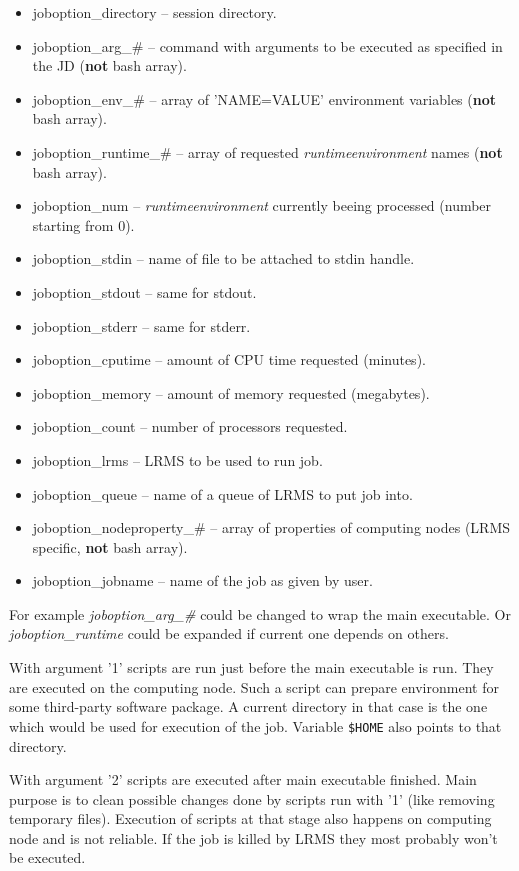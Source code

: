 \documentclass{article}                            %
\begin{document}
\begin{itemize}
\item joboption\_directory -- session directory.
\item joboption\_arg\_\# -- command with arguments to be executed as specified
in the JD (\textbf{not} bash array).
\item joboption\_env\_\# -- array of 'NAME=VALUE' environment variables (\textbf{not}
bash array).
\item joboption\_runtime\_\# -- array of requested \emph{runtimeenvironment}
names (\textbf{not} bash array).
\item joboption\_num -- \emph{runtimeenvironment} currently beeing processed
(number starting from 0).
\item joboption\_stdin -- name of file to be attached to stdin handle.
\item joboption\_stdout -- same for stdout.
\item joboption\_stderr -- same for stderr.
\item joboption\_cputime -- amount of CPU time requested (minutes).
\item joboption\_memory -- amount of memory requested (megabytes).
\item joboption\_count -- number of processors requested.
\item joboption\_lrms -- LRMS to be used to run job.
\item joboption\_queue -- name of a queue of LRMS to put job into.
\item joboption\_nodeproperty\_\# -- array of properties of computing nodes
(LRMS specific, \textbf{not} bash array).
\item joboption\_jobname -- name of the job as given by user.
\end{itemize}

For example \emph{joboption\_arg\_\#} could be changed to wrap the main
executable. Or \emph{joboption\_runtime} could be expanded if current
one depends on others.

With argument '1' scripts are run just before the main executable is run.
They are executed on the computing node. Such a script can prepare environment
for some third-party software package. A current directory in that
case is the one which would be used for execution of the job. Variable \verb|$HOME|
also points to that directory.

With argument '2' scripts are executed after main executable finished.
Main purpose is to clean possible changes done by scripts run with
'1' (like removing temporary files). Execution of scripts at that
stage also happens on computing node and is not reliable. If the job
is killed by LRMS they most probably won't be executed.
\end{document}
